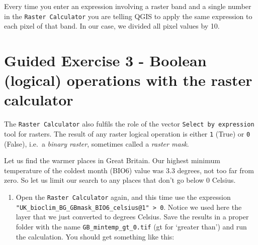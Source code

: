 \documentclass[
  letterpaper,
  DIV=11,
  numbers=noendperiod]{scrreprt}
\providecommand{\tightlist}{%
  \setlength{\itemsep}{0pt}\setlength{\parskip}{0pt}}\usepackage{longtable,booktabs,array}
\begin{document}
Every time you enter an expression involving a raster band and a single
number in the \texttt{Raster\ Calculator} you are telling QGIS to apply
the same expression to each pixel of that band. In our case, we divided
all pixel values by 10.

\section{Guided Exercise 3 - Boolean (logical) operations with the
raster
calculator}\label{guided-exercise-3---boolean-logical-operations-with-the-raster-calculator}

The \texttt{Raster\ Calculator} also fulfils the role of the vector
\texttt{Select\ by\ expression} tool for rasters. The result of any
raster logical operation is either \texttt{1} (True) or \texttt{0}
(False), i.e.~a \emph{binary raster}, sometimes called a \emph{raster
mask}.

Let us find the warmer places in Great Britain. Our highest minimum
temperature of the coldest month (BIO6) value was 3.3 degrees, not too
far from zero. So let us limit our search to any places that don't go
below 0 Celsius.

\begin{enumerate}
\def\labelenumi{(\arabic{enumi})}
\setcounter{enumi}{167}
\tightlist
\item
  Open the \texttt{Raster\ Calculator} again, and this time use the
  expression
  \texttt{"UK\_bioclim\_BG\_GBmask\_BIO6\_celsius@1"\ \textgreater{}\ 0}.
  Notice we used here the layer that we just converted to degrees
  Celsius. Save the results in a proper folder with the name
  \texttt{GB\_mintemp\_gt\_0.tif} (gt for `greater than') and run the
  calculation. You should get something like this:
\end{enumerate}
\end{document}
